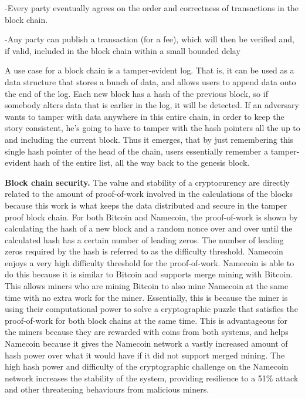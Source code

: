 -Every party eventually agrees on the order and correctness of transactions in the block chain.

-Any party can publish a transaction (for a fee), which will then be verified and, if valid, included in the block chain within a small bounded delay

A use case for a block chain is a tamper-evident log. That is, it can be used as a data structure that stores a bunch of data, and allows users to append data onto the end of the log. Each new block has a hash of the previous block, so if somebody alters data that is earlier in the log, it will be detected. If an adversary wants to tamper with data anywhere in this entire chain, in order to keep the story consistent, he’s going to have to tamper with the hash pointers all the up to and including the current block. Thus it emerges, that by just remembering this single hash pointer of the head of the chain, users essentially remember a tamper-evident hash of the entire list, all the way back to the genesis block. 


{\bf Block chain security.}
The value and stability of a cryptocurency are directly related to the amount of proof-of-work involved in the calculations of the blocks because this work is what keeps the data distributed and secure in the tamper proof block chain. For both Bitcoin and Namecoin, the proof-of-work is shown by calculating the hash of a new block and a random nonce over and over until the calculated hash has a certain number of leading zeros. The number of leading zeros required by the hash is referred to as the difficulty threshold. Namecoin enjoys a very high difficulty threshold for the proof-of-work. Namecoin is able to do this because it is similar to Bitcoin and supports merge mining with Bitcoin. This allows miners who are mining Bitcoin to also mine Namecoin at the same time with no extra work for the miner. Essentially, this is because the miner is using their computational power to solve a cryptographic puzzle that satisfies the proof-of-work for both block chains at the same time. This is advantageous for the miners because they are rewarded with coins from both systems, and helps Namecoin because it gives the Namecoin network a vastly increased amount of hash power over what it would have if it did not support merged mining. The high hash power and difficulty of the cryptographic challenge on the Namecoin network increases the stability of the system, providing resilience to a 51\% attack and other threatening behaviours from malicious miners.

